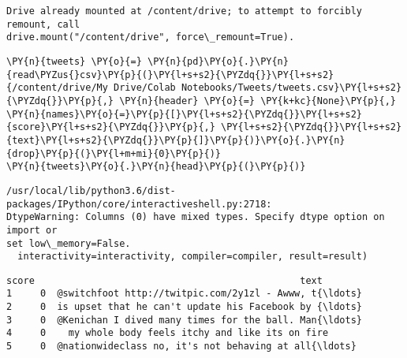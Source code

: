 \documentclass[11pt]{article}
\begin{document}
    \begin{Verbatim}[commandchars=\\\{\}]
Drive already mounted at /content/drive; to attempt to forcibly remount, call
drive.mount("/content/drive", force\_remount=True).
    \end{Verbatim}

    \begin{tcolorbox}[breakable, size=fbox, boxrule=1pt, pad at break*=1mm,colback=cellbackground, colframe=cellborder]
\begin{Verbatim}[commandchars=\\\{\}]
\PY{n}{tweets} \PY{o}{=} \PY{n}{pd}\PY{o}{.}\PY{n}{read\PYZus{}csv}\PY{p}{(}\PY{l+s+s2}{\PYZdq{}}\PY{l+s+s2}{/content/drive/My Drive/Colab Notebooks/Tweets/tweets.csv}\PY{l+s+s2}{\PYZdq{}}\PY{p}{,} \PY{n}{header} \PY{o}{=} \PY{k+kc}{None}\PY{p}{,} \PY{n}{names}\PY{o}{=}\PY{p}{[}\PY{l+s+s2}{\PYZdq{}}\PY{l+s+s2}{score}\PY{l+s+s2}{\PYZdq{}}\PY{p}{,} \PY{l+s+s2}{\PYZdq{}}\PY{l+s+s2}{text}\PY{l+s+s2}{\PYZdq{}}\PY{p}{]}\PY{p}{)}\PY{o}{.}\PY{n}{drop}\PY{p}{(}\PY{l+m+mi}{0}\PY{p}{)}
\PY{n}{tweets}\PY{o}{.}\PY{n}{head}\PY{p}{(}\PY{p}{)}
\end{Verbatim}
\end{tcolorbox}

    \begin{Verbatim}[commandchars=\\\{\}]
/usr/local/lib/python3.6/dist-packages/IPython/core/interactiveshell.py:2718:
DtypeWarning: Columns (0) have mixed types. Specify dtype option on import or
set low\_memory=False.
  interactivity=interactivity, compiler=compiler, result=result)
    \end{Verbatim}

            \begin{tcolorbox}[breakable, size=fbox, boxrule=.5pt, pad at break*=1mm, opacityfill=0]
\begin{Verbatim}[commandchars=\\\{\}]
  score                                               text
1     0  @switchfoot http://twitpic.com/2y1zl - Awww, t{\ldots}
2     0  is upset that he can't update his Facebook by {\ldots}
3     0  @Kenichan I dived many times for the ball. Man{\ldots}
4     0    my whole body feels itchy and like its on fire
5     0  @nationwideclass no, it's not behaving at all{\ldots}
\end{Verbatim}
\end{tcolorbox}
        
\end{document}
